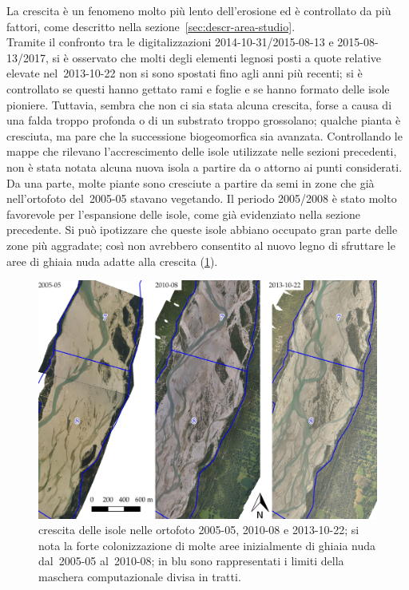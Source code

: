 La crescita è un fenomeno molto più lento dell'erosione ed è controllato da più fattori, come descritto nella sezione~\ref{sec:descr-area-studio}.
\\
Tramite il confronto tra le digitalizzazioni 2014-10-31/2015-08-13 e 2015-08-13/2017, si è osservato che molti degli elementi legnosi posti a quote relative elevate nel~2013-10-22 non si sono spostati fino agli anni più recenti; si è controllato se questi hanno gettato rami e foglie e se hanno formato delle isole pioniere.
Tuttavia, sembra che non ci sia stata alcuna crescita, forse a causa di una falda troppo profonda o di un substrato troppo grossolano; qualche pianta è cresciuta, ma pare che la successione biogeomorfica sia avanzata.
Controllando le mappe che rilevano l'accrescimento delle isole utilizzate nelle sezioni precedenti, non è stata notata alcuna nuova isola a partire da o attorno ai punti considerati.
\\
Da una parte, molte piante sono cresciute a partire da semi in zone che già nell'ortofoto del~2005-05 stavano vegetando. Il periodo 2005/2008 è stato molto favorevole per l'espansione delle isole, come già evidenziato nella sezione precedente.
Si può ipotizzare che queste isole abbiano occupato gran parte delle zone più aggradate; così non avrebbero consentito al nuovo legno di sfruttare le aree di ghiaia nuda adatte alla crescita (\cref{fig:crescita-2005-2010-2013}).
%
\begin{figure}
	\centering
	\includegraphics[width = \textwidth]{files/crescita_2005_2010_2013.jpeg}
	\caption[crescita delle isole nelle ortofoto 2005-05, 2010-08 e 2013-10-22]{crescita delle isole nelle ortofoto 2005-05, 2010-08 e 2013-10-22; si nota la forte colonizzazione di molte aree inizialmente di ghiaia nuda dal~2005-05 al~2010-08; in blu sono rappresentati i limiti della maschera computazionale divisa in tratti.}
	\label{fig:crescita-2005-2010-2013}
\end{figure}
%
